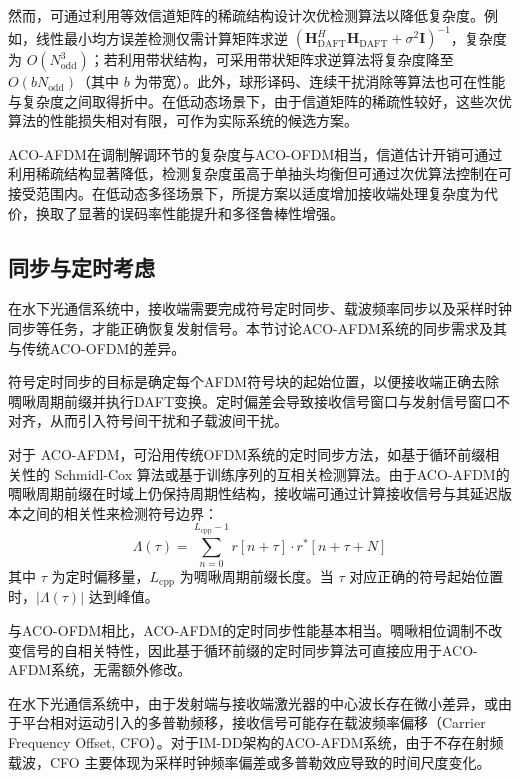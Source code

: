 然而，可通过利用等效信道矩阵的稀疏结构设计次优检测算法以降低复杂度。例如，线性最小均方误差检测仅需计算矩阵求逆 $(\mathbf{H}_{\mathrm{DAFT}}^H \mathbf{H}_{\mathrm{DAFT}} + \sigma^2 \mathbf{I})^{-1}$，复杂度为 $O(N_{\mathrm{odd}}^3)$；若利用带状结构，可采用带状矩阵求逆算法将复杂度降至 $O(bN_{\mathrm{odd}})$（其中 $b$ 为带宽）。此外，球形译码、连续干扰消除等算法也可在性能与复杂度之间取得折中。在低动态场景下，由于信道矩阵的稀疏性较好，这些次优算法的性能损失相对有限，可作为实际系统的候选方案。

ACO-AFDM在调制解调环节的复杂度与ACO-OFDM相当，信道估计开销可通过利用稀疏结构显著降低，检测复杂度虽高于单抽头均衡但可通过次优算法控制在可接受范围内。在低动态多径场景下，所提方案以适度增加接收端处理复杂度为代价，换取了显著的误码率性能提升和多径鲁棒性增强。

\subsection{同步与定时考虑}
\label{subsec:synchronization_timing}

在水下光通信系统中，接收端需要完成符号定时同步、载波频率同步以及采样时钟同步等任务，才能正确恢复发射信号。本节讨论ACO-AFDM系统的同步需求及其与传统ACO-OFDM的差异。


符号定时同步的目标是确定每个AFDM符号块的起始位置，以便接收端正确去除啁啾周期前缀并执行DAFT变换。定时偏差会导致接收信号窗口与发射信号窗口不对齐，从而引入符号间干扰和子载波间干扰。

对于 ACO-AFDM，可沿用传统OFDM系统的定时同步方法，如基于循环前缀相关性的 Schmidl-Cox 算法或基于训练序列的互相关检测算法。由于ACO-AFDM的啁啾周期前缀在时域上仍保持周期性结构，接收端可通过计算接收信号与其延迟版本之间的相关性来检测符号边界：
\begin{equation}
\Lambda(\tau) = \sum_{n=0}^{L_{\mathrm{cpp}}-1} r[n+\tau] \cdot r^*[n+\tau+N]
\end{equation}
其中 $\tau$ 为定时偏移量，$L_{\mathrm{cpp}}$ 为啁啾周期前缀长度。当 $\tau$ 对应正确的符号起始位置时，$|\Lambda(\tau)|$ 达到峰值。

与ACO-OFDM相比，ACO-AFDM的定时同步性能基本相当。啁啾相位调制不改变信号的自相关特性，因此基于循环前缀的定时同步算法可直接应用于ACO-AFDM系统，无需额外修改。


在水下光通信系统中，由于发射端与接收端激光器的中心波长存在微小差异，或由于平台相对运动引入的多普勒频移，接收信号可能存在载波频率偏移（Carrier Frequency Offset, CFO）。对于IM-DD架构的ACO-AFDM系统，由于不存在射频载波，CFO 主要体现为采样时钟频率偏差或多普勒效应导致的时间尺度变化。

